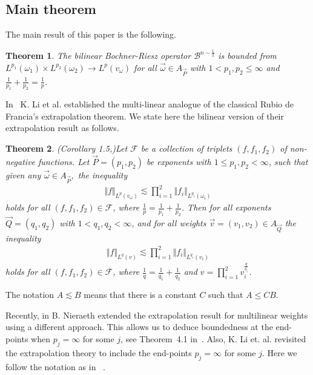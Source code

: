 \documentclass[a4paper,12pt]{amsart}
\newtheorem{theorem}{Theorem}[section]
\begin{document}
\subsection{Main theorem}\label{pf}
The main result of this paper is the following. 
\begin{theorem} \label{mainthm} The bilinear Bochner-Riesz operator $\mathcal {B}^{n-\frac{1}{2}}$ is bounded from  $L^{p_{1}}(\omega_{1})\times L^{p_{2}}(\omega_{2})\rightarrow L^{p}(v_{\omega})$ for all $\vec{\omega}\in A_{\vec{P}}$ with $1<p_{1}, p_{2} \leq \infty$ and $\frac{1}{p_{1}}+\frac{1}{p_{2}}=\frac{1}{p}$. 
\end{theorem}
In~\cite{KJS} K. Li et al. established the multi-linear analogue of the classical Rubio de Francia's extrapolation theorem. We state here the bilinear version of their extrapolation result as follows. 
\begin{theorem}(Corollary 1.5,\cite{KJS})\label{extra} 
Let $\mathcal{F}$ be a collection of  triplets $(f,f_1,f_2)$ of non-negative functions. Let $\vec{P}=(p_{1},p_2)$ be exponents with $1\leq p_{1},p_2<\infty$, such that given any $\vec{\omega}\in A_{\vec{P}},$ the inequality 
\begin{eqnarray*}\Vert f\Vert_{L^{p}(v_{\omega})}\lesssim \prod^{2}_{i=1}\Vert f_{i}\Vert_{L^{p_{i}}(\omega_{i})}
\end{eqnarray*}
holds for all $(f,f_{1},f_{2})\in\mathcal{F}$, where $\frac{1}{p}=\frac{1}{p_{1}}+\frac{1}{p_{2}}$. Then for all exponents $\vec{Q}=(q_{1},q_{2})$ with $1< q_1,q_2<\infty$, and for all weights $\vec{v}=(v_{1},v_{2})\in A_{\vec{Q}}$ the inequality  
\begin{eqnarray*} \Vert f\Vert_{L^{q}(v)}\lesssim \prod^{2}_{i=1}\Vert f_{i}\Vert_{L^{q_{i}}(v_{i})}
\end{eqnarray*}
 holds for all $(f,f_{1},f_{2})\in\mathcal{F}$, where $\frac{1}{q}=\frac{1}{q_{1}}+\frac{1}{q_{2}}$ and $v=\prod^{2}_{i=1}v^{\frac{q}{q_{i}}}_{i}$.
\end{theorem}  
The notation $A\lesssim B$ means that there is a constant $C$ such that $A\leq CB.$

 Recently, in \cite{Bas} B. Nieraeth extended the extrapolation result for multilinear weights using a different approach. This allows us to deduce boundedness at the end-points when $p_{j}=\infty$ for some $j$, see Theorem~4.1 in~\cite{Bas}.  Also, \cite{KJHS}  K. Li et. al. revisited the extrapolation theory to include the end-points $p_{j}=\infty$ for some $j$. Here we follow the notation as in ~\cite{Bas}.
\end{document}
